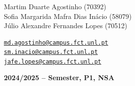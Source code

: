 \documentclass[12pt]{article}
\begin{document}
\begin{center}
    \begin{minipage}{0.5\textwidth}
        \begin{flushleft}
            Martim Duarte Agostinho (70392)\\
            Sofia Margarida Mafra Dias Inácio (58079)\\
            Júlio Alexandre Fernandes Lopes (70512)\\
        \end{flushleft}
    \end{minipage}%
    \begin{minipage}{0.5\textwidth}
        \begin{flushright}
            \href{mailto:md.agostinho@campus.fct.unl.pt}{\texttt{md.agostinho@campus.fct.unl.pt}}\\
            \href{mailto:sm.inacio@campus.fct.unl.pt}{\texttt{sm.inacio@campus.fct.unl.pt}}\\
            \href{mailto:jafe.lopes@campus.fct.unl.pt}{\texttt{jafe.lopes@campus.fct.unl.pt}}
        \end{flushright}
    \end{minipage}
\end{center}
 

\vspace{4cm}

\begin{center}
    \large \bf 2024/2025 --  Semester, P1, NSA
\end{center}

\thispagestyle{empty}

\setcounter{page}{0}

\newpage

\newpage

\tableofcontents %

\vspace{4cm}

\newpage

\listoffigures

\listoftables


\newpage

% 


\pagebreak




\pagebreak




\pagebreak

\end{document}
